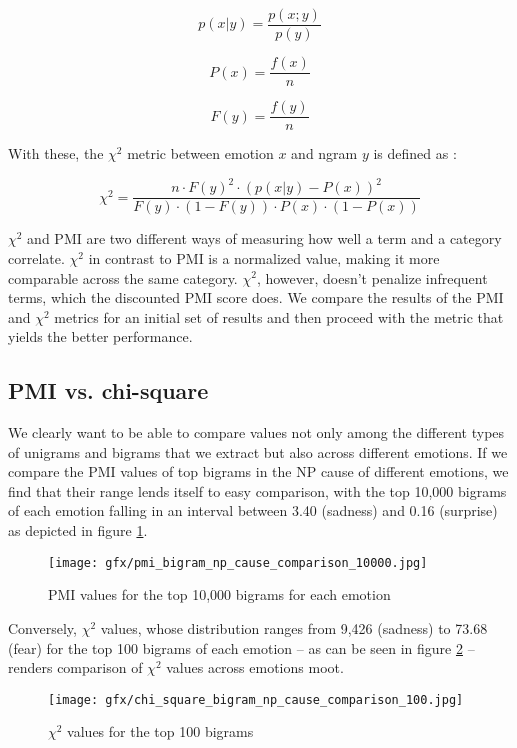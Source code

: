 $$p(x|y) = \frac{p(x;y)}{p(y)}$$

$$P(x) = \frac{f(x)}{n}$$

$$F(y) = \frac{f(y)}{n}$$

With these, the $\chi^{2}$ metric between emotion $x$ and ngram $y$ is defined as \cite{chi-square}: 

$$\chi^{2} = \frac{n \cdot F(y)^{2} \cdot (p(x|y) - P(x))^{2}}{F(y) \cdot (1 - F(y)) \cdot P(x) \cdot (1 - P(x))}$$

$\chi^{2}$ and PMI are two different ways of measuring how well a term and a category correlate. $\chi^{2}$ in contrast to PMI is a normalized value, making it more comparable across the same category. $\chi^{2}$, however, doesn't penalize infrequent terms, which the discounted PMI score does. We compare the results of the PMI and $\chi^{2}$ metrics for an initial set of results and then proceed with the metric that yields the better performance.

\subsection{PMI vs. chi-square}

We clearly want to be able to compare values not only among the different types of unigrams and bigrams that we extract but also across different emotions. If we compare the PMI values of top bigrams in the NP cause of different emotions, we find that their range lends itself to easy comparison, with the top 10,000 bigrams of each emotion falling in an interval between 3.40 (sadness) and 0.16 (surprise) as depicted in figure \ref{fig:pmi distribution}.

\begin{figure}[bth]
\texttt{[image: gfx/pmi\_bigram\_np\_cause\_comparison\_10000.jpg]}
\caption{PMI values for the top 10,000 bigrams for each emotion}\label{fig:pmi distribution}
\end{figure}

Conversely, $\chi^{2}$ values, whose distribution ranges from 9,426 (sadness) to 73.68 (fear) for the top 100 bigrams of each emotion -- as can be seen in figure \ref{fig:chi-square distribution} -- renders comparison of $\chi^{2}$ values across emotions moot.

\begin{figure}[bth]
\texttt{[image: gfx/chi\_square\_bigram\_np\_cause\_comparison\_100.jpg]}
\caption{$\chi^{2}$ values for the top 100 bigrams}\label{fig:chi-square distribution}
\end{figure}

